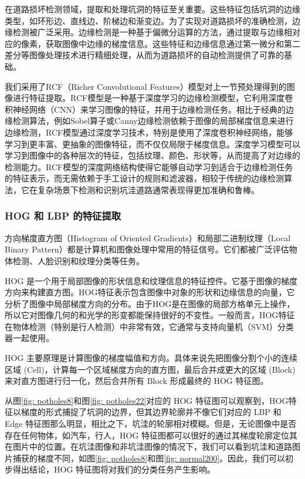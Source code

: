 \documentclass[a4paper, 10pt]{article}
\begin{document}
	在道路损坏检测领域，提取和处理坑洞的特征至关重要。这些特征包括坑洞的边缘类型，如环形边、直线边、阶梯边和渐变边。为了实现对道路损坏的准确检测，边缘检测被广泛采用。边缘检测是一种基于偏微分运算的方法，通过提取与边缘相对应的像素，获取图像中边缘的梯度信息。这些特征和边缘信息通过第一微分和第二差分等图像处理技术进行精细处理，从而为道路损坏的自动检测提供了可靠的基础。
	
	我们采用了RCF（Richer Convolutional Features）模型对上一节预处理得到的图像进行特征提取。RCF模型是一种基于深度学习的边缘检测模型，它利用深度卷积神经网络（CNN）来学习图像的特征，并用于边缘检测任务。相比于经典的边缘检测算法，例如Sobel算子或Canny边缘检测依赖于图像的局部梯度信息来进行边缘检测，RCF模型通过深度学习技术，特别是使用了深度卷积神经网络，能够学习到更丰富、更抽象的图像特征，而不仅仅局限于梯度信息。深度学习模型可以学习到图像中的各种层次的特征，包括纹理、颜色、形状等，从而提高了对边缘的检测能力。RCF模型的深度网络结构使得它能够自动学习到适合于边缘检测任务的特征表示，而无需依赖于手工设计的规则和滤波器，相较于传统的边缘检测算法，它在复杂场景下检测和识别坑洼道路通常表现得更加准确和鲁棒。
	
	\subsubsection{HOG 和 LBP 的特征提取}
	
	方向梯度直方图（Histogram of Oriented Gradients）和局部二进制纹理（Local Binary Pattern）都是计算机和图像处理中常用的特征信号。它们都被广泛评估物体检测、人脸识别和纹理分类等任务。
	
	HOG 是一个用于局部图像的形状信息和纹理信息的特征控件。它基于图像的梯度方向来构建直方图。HOG特征表示包含图像中对象的形状和边缘信息的向量，它分析了图像中局部梯度方向的分布。由于HOG是在图像的局部方格单元上操作，所以它对图像几何的和光学的形变都能保持很好的不变性。一般而言，HOG特征在物体检测（特别是行人检测）中非常有效，它通常与支持向量机（SVM）分类器一起使用。
	
	HOG 主要原理是计算图像的梯度幅值和方向。具体来说先把图像分割个小的连续区域 (Cell)，计算每一个区域梯度方向的直方图，最后合并成更大的区域 (Block) 来对直方图进行归一化，然后合并所有 Block 形成最终的 HOG 特征图。
	
	从图\ref{fig: potholes8}和图\ref{fig: potholes22}对应的 HOG 特征图可以观察到，HOG特征以梯度的形式捕捉了坑洞的边界，但其边界轮廓并不像它们对应的 LBP 和 Edge 特征图那么明显，相比之下，坑洼的轮廓相对模糊。但是，无论图像中是否存在任何物体，如汽车，行人，HOG 特征图都可以很好的通过其梯度轮廓定位其在图片中的位置。在坑洼图像和非坑洼图像的情况下，我们可以看到坑洼和道路图片捕获的梯度不同，如图\ref{fig: potholes8}和图\ref{fig: normal200}。因此，我们可以初步得出结论，HOG 特征图将对我们的分类任务产生影响。
	
\end{document}
